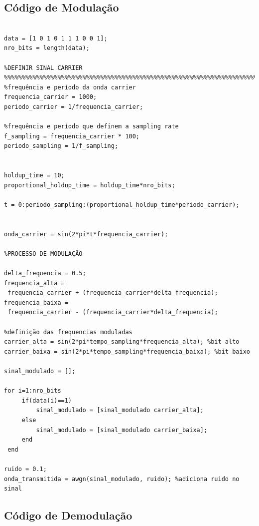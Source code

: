 \documentclass[11pt,a4paper]{report}
\begin{document}
\subsection{Código de Modulação}
	\begin{verbatim}

data = [1 0 1 0 1 1 1 0 0 1]; 
nro_bits = length(data);

%DEFINIR SINAL CARRIER
%%%%%%%%%%%%%%%%%%%%%%%%%%%%%%%%%%%%%%%%%%%%%%%%%%%%%%%%%%%%%%%%%%%%%%%%%
%frequência e período da onda carrier
frequencia_carrier = 1000; 
periodo_carrier = 1/frequencia_carrier;

%frequência e período que definem a sampling rate
f_sampling = frequencia_carrier * 100;
periodo_sampling = 1/f_sampling;


holdup_time = 10;
proportional_holdup_time = holdup_time*nro_bits;

t = 0:periodo_sampling:(proportional_holdup_time*periodo_carrier);


onda_carrier = sin(2*pi*t*frequencia_carrier); 

%PROCESSO DE MODULAÇÃO

delta_frequencia = 0.5; 
frequencia_alta =
 frequencia_carrier + (frequencia_carrier*delta_frequencia);
frequencia_baixa =
 frequencia_carrier - (frequencia_carrier*delta_frequencia);

%definição das frequencias moduladas
carrier_alta = sin(2*pi*tempo_sampling*frequencia_alta); %bit alto
carrier_baixa = sin(2*pi*tempo_sampling*frequencia_baixa); %bit baixo

sinal_modulado = [];

for i=1:nro_bits
     if(data(i)==1)
         sinal_modulado = [sinal_modulado carrier_alta];
     else
         sinal_modulado = [sinal_modulado carrier_baixa];
     end
 end
 
ruido = 0.1;
onda_transmitida = awgn(sinal_modulado, ruido); %adiciona ruido no sinal
\end{verbatim}


\subsection{Código de Demodulação}
\end{document}
